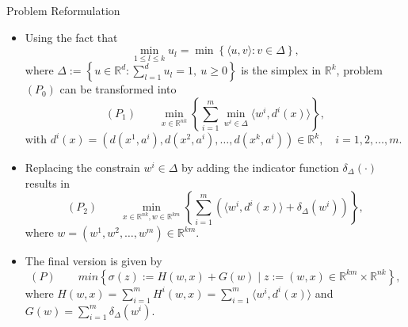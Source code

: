 \documentclass[9pt]{beamer}
\newcommand{\R}{\mathbb{R}} %
\begin{document}
    \begin{frame}{Problem Reformulation}
	    \begin{itemize}[<+->]
	    	\item Using the fact that
				\begin{equation*}
					\min\limits_{1 \leq l \leq k} u_l = \min \left\lbrace \langle u,v \rangle : v \in \Delta \right\rbrace ,
				\end{equation*}
				where $\Delta := \left\lbrace u \in \mathbb{R}^d : \sum\limits_{l=1}^{d} u_l = 1, \: u \geq 0 \right\rbrace$ is the simplex in $\R^k$, problem $(P_0)$ can be transformed into
				\begin{equation*}
					(P_1) \qquad \min\limits_{x \in \R^{nk}} \left\{ \sum\limits_{i=1}^{m} \min\limits_{w^i \in \Delta} \langle w^i , d^i(x) \rangle \right\},
				\end{equation*}
				with $d^{i}(x) = (d(x^1,a^i), d(x^2,a^i), \ldots , d(x^k,a^i)) \in \mathbb{R}^k, \quad i=1, 2, \ldots , m$.
			\item Replacing the constrain $w^i \in \Delta$ by adding the indicator function $\delta_{\Delta}(\cdot)$ results in
				\begin{equation*}
					(P_2) \qquad \min\limits_{x \in \mathbb{R}^{nk} , w \in \mathbb{R}^{km}} \left\lbrace \sum\limits_{i=1}^{m} \left( \langle w^i , d^i(x) \rangle + \delta_{\Delta}(w^i) \right) \right\rbrace,
				\end{equation*}
				where $w = (w^1, w^2, \ldots , w^m) \in \R^{km}$.
			\item The final version is given by
				\begin{equation*}
					(P) \qquad min \left\lbrace \sigma(z) := H(w,x) + G(w) \mid z := (w,x) \in \R^{km} \times \R^{nk} \right\rbrace, 
				\end{equation*}
				where $H(w,x) = \sum\limits_{i=1}^{m} H^i(w,x) = \sum\limits_{i=1}^{m} \langle w^i , d^i(x) \rangle$ and $G(w) = \sum\limits_{i=1}^{m} \delta_{\Delta}(w^i).$
		\end{itemize}
    \end{frame}
    
\end{document}
